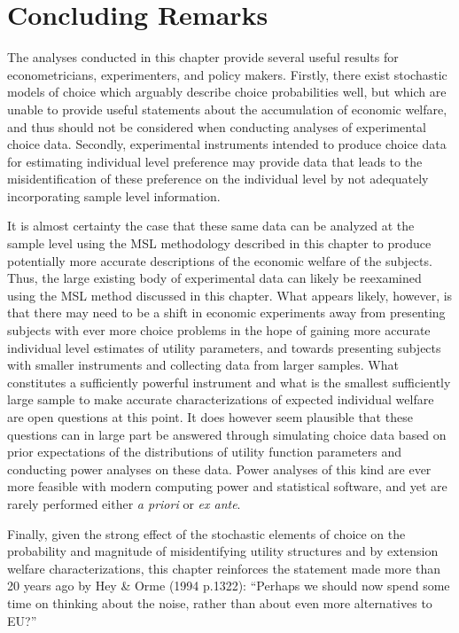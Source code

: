 \documentclass[../main.tex]{subfiles}
\begin{document}
\section{Concluding Remarks}

The analyses conducted in this chapter provide several useful results for econometricians, experimenters, and policy makers.
Firstly, there exist stochastic models of choice which arguably describe choice probabilities well, but which are unable to provide useful statements about the accumulation of economic welfare, and thus should not be considered when conducting analyses of experimental choice data.
Secondly, experimental instruments intended to produce choice data for estimating individual level preference may provide data that leads to the misidentification of these preference on the individual level by not adequately incorporating sample level information.

It is almost certainty the case that these same data can be analyzed at the sample level using the MSL methodology described in this chapter to produce potentially more accurate descriptions of the economic welfare of the subjects.
Thus, the large existing body of experimental data can likely be reexamined using the MSL method discussed in this chapter.
What appears likely, however, is that there may need to be a shift in economic experiments away from presenting subjects with ever more choice problems in the hope of gaining more accurate individual level estimates of utility parameters, and towards presenting subjects with smaller instruments and collecting data from larger samples.
What constitutes a sufficiently powerful instrument and what is the smallest sufficiently large sample to make accurate characterizations of expected individual welfare are open questions at this point.
It does however seem plausible that these questions can in large part be answered through simulating choice data based on prior expectations of the distributions of utility function parameters and conducting power analyses on these data.
Power analyses of this kind are ever more feasible with modern computing power and statistical software, and yet are rarely performed either \textit{a priori} or \textit{ex ante}.

Finally, given the strong effect of the stochastic elements of choice on the probability and magnitude of misidentifying utility structures and by extension welfare characterizations, this chapter reinforces the statement made more than 20 years ago by Hey \& Orme (1994 p.1322):
\enquote{Perhaps we should now spend some time on thinking about the noise, rather than about even more alternatives to EU?}
\end{document}
